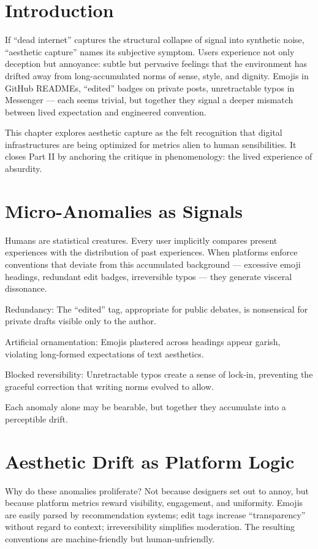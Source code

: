 \documentclass{book}
\begin{document}
\section{Introduction}

If ``dead internet'' captures the structural collapse of signal into synthetic noise, ``aesthetic capture'' names its subjective symptom. Users experience not only deception but annoyance: subtle but pervasive feelings that the environment has drifted away from long-accumulated norms of sense, style, and dignity. Emojis in GitHub READMEs, ``edited'' badges on private posts, unretractable typos in Messenger — each seems trivial, but together they signal a deeper mismatch between lived expectation and engineered convention.

This chapter explores aesthetic capture as the felt recognition that digital infrastructures are being optimized for metrics alien to human sensibilities. It closes Part II by anchoring the critique in phenomenology: the lived experience of absurdity.

\section{Micro-Anomalies as Signals}

Humans are statistical creatures. Every user implicitly compares present experiences with the distribution of past experiences. When platforms enforce conventions that deviate from this accumulated background — excessive emoji headings, redundant edit badges, irreversible typos — they generate visceral dissonance.

Redundancy: The ``edited'' tag, appropriate for public debates, is nonsensical for private drafts visible only to the author.

Artificial ornamentation: Emojis plastered across headings appear garish, violating long-formed expectations of text aesthetics.

Blocked reversibility: Unretractable typos create a sense of lock-in, preventing the graceful correction that writing norms evolved to allow.

Each anomaly alone may be bearable, but together they accumulate into a perceptible drift.

\section{Aesthetic Drift as Platform Logic}

Why do these anomalies proliferate? Not because designers set out to annoy, but because platform metrics reward visibility, engagement, and uniformity. Emojis are easily parsed by recommendation systems; edit tags increase ``transparency'' without regard to context; irreversibility simplifies moderation. The resulting conventions are machine-friendly but human-unfriendly.
\end{document}
